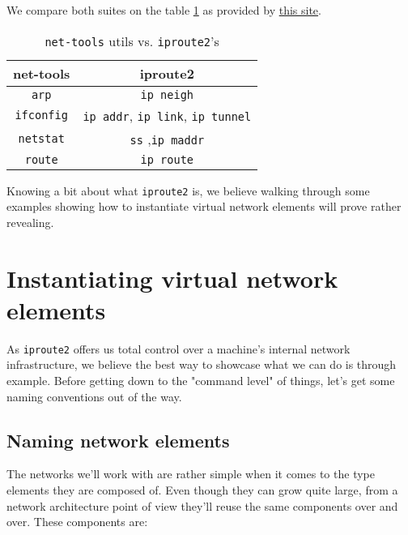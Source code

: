                 We compare both suites on the table \ref{tab:net-tools-vs-iproute2} as provided by \href{https://www.thegeekdiary.com/comparing-net-tools-v-s-iproute-package-commands/}{this site}.

                \begin{table}
                    \centering
                    \begin{tabular}{|c|c|}
                        \hline
                        \textbf{net-tools} & \textbf{iproute2}\\
                        \hline
                        \texttt{arp} & \texttt{ip neigh}\\
                        \hline
                        \texttt{ifconfig} & \texttt{ip addr}, \texttt{ip link}, \texttt{ip tunnel}\\
                        \hline
                        \texttt{netstat} & \texttt{ss} ,\texttt{ip maddr}\\
                        \hline
                        \texttt{route} & \texttt{ip route}\\
                        \hline
                    \end{tabular}
                    \caption{\texttt{net-tools} utils vs. \texttt{iproute2}'s}
                    \label{tab:net-tools-vs-iproute2}
                \end{table}

            Knowing a bit about what \texttt{iproute2} is, we believe walking through some examples showing how to instantiate virtual network elements will prove rather revealing.

    \section{Instantiating virtual network elements}
        As \texttt{iproute2} offers us total control over a machine's internal network infrastructure, we believe the best way to showcase what we can do is through example. Before getting down to the "command level" of things, let's get some naming conventions out of the way.

        \subsection{Naming network elements}
            The networks we'll work with are rather simple when it comes to the type elements they are composed of. Even though they can grow quite large, from a network architecture point of view they'll reuse the same components over and over. These components are:

